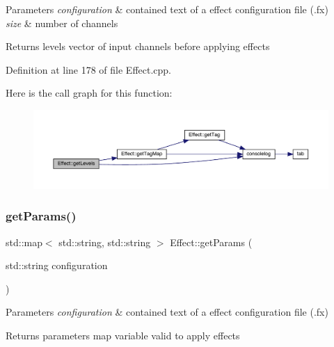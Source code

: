 \begin{DoxyParams}{Parameters}
{\em configuration} & contained text of a effect configuration file (.fx) \\
\hline
{\em size} & number of channels \\
\hline
\end{DoxyParams}
\begin{DoxyReturn}{Returns}
levels vector of input channels before applying effects 
\end{DoxyReturn}


Definition at line 178 of file Effect.\+cpp.

Here is the call graph for this function\+:
\nopagebreak
\begin{figure}[H]
\begin{center}
\leavevmode
\includegraphics[width=350pt]{class_effect_ad0f19e11abff1f815c8b3b36b1f28c92_cgraph}
\end{center}
\end{figure}
\mbox{\label{class_effect_ac322ae94a6b15b2d81053a55ce7542e2}} 
\subsubsection{\texorpdfstring{get\+Params()}{getParams()}}
{\footnotesize\ttfamily std\+::map$<$ std\+::string, std\+::string $>$ Effect\+::get\+Params (\begin{DoxyParamCaption}\item[{std\+::string}]{configuration }\end{DoxyParamCaption})\hspace{0.3cm}{\ttfamily [static]}}


\begin{DoxyParams}{Parameters}
{\em configuration} & contained text of a effect configuration file (.fx) \\
\hline
\end{DoxyParams}
\begin{DoxyReturn}{Returns}
parameters map variable valid to apply effects 
\end{DoxyReturn}


